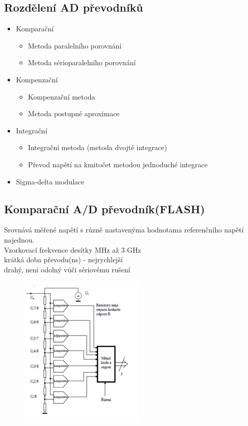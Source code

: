 \subsection*{Rozdělení AD převodníků}
\begin{itemize}
    \item Komparační
          \begin{itemize}
              \item Metoda paralelního porovnání
              \item Metoda sérioparalelního porovnání
          \end{itemize}
    \item Kompenzační
          \begin{itemize}
              \item Kompenzační metoda
              \item Metoda postupné aproximace
          \end{itemize}
    \item Integrační
          \begin{itemize}
              \item Integrační metoda (metoda dvojté integrace)
              \item Převod napětí na kmitočet metodou jednoduché integrace
          \end{itemize}
    \item Sigma-delta modulace
\end{itemize}

\subsection*{Komparační A/D převodník(FLASH)}
Srovnává měřené napětí s různě nastavenýma hodnotama referenčního napětí najednou.\\
Vzorkovací frekvence desítky MHz až 3 GHz\\
krátká doba převodu(ns) - nejrychlejší\\
drahý, není odolný vůči sériovému rušení
\begin{figure}[H]
    \includegraphics*[scale = 1.3]{images/adc_komparacni.png}
\end{figure}
\newpage
